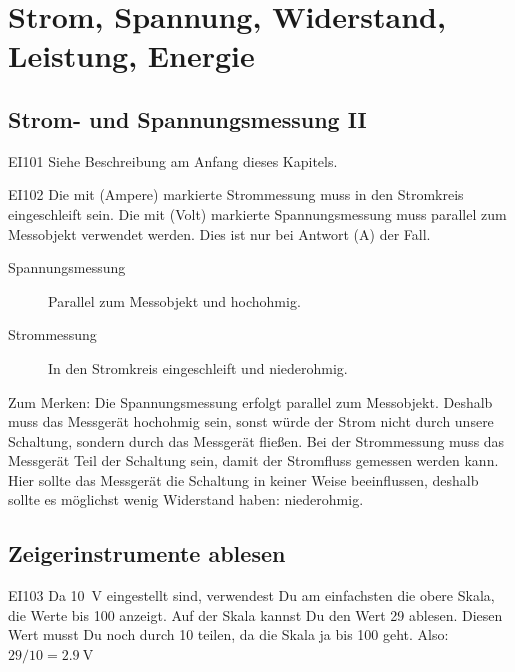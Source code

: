 \setcounter{section}{2}
\section{Strom, Spannung, Widerstand, Leistung, Energie}
\subsection{Strom- und Spannungsmessung II}

\begin{sol}{EI101}
  Siehe Beschreibung am Anfang dieses Kapitels.
\end{sol}

\begin{sol}{EI102}
  Die mit (Ampere) markierte Strommessung muss in den Stromkreis eingeschleift sein. Die mit (Volt) markierte Spannungsmessung muss parallel zum Messobjekt verwendet werden. Dies ist nur bei Antwort (A) der Fall.
\end{sol}

\begin{ohmchapter}

    \begin{description}
        \item[Spannungsmessung] Parallel zum Messobjekt und hochohmig.
        \item[Strommessung] In den Stromkreis eingeschleift und niederohmig.  
    \end{description}

    Zum Merken: Die Spannungsmessung erfolgt parallel zum Messobjekt. Deshalb muss das Messgerät hochohmig sein, sonst würde der Strom nicht durch unsere Schaltung, sondern durch das Messgerät fließen. Bei der Strommessung muss das Messgerät Teil der Schaltung sein, damit der Stromfluss gemessen werden kann. Hier sollte das Messgerät die Schaltung in keiner Weise beeinflussen, deshalb sollte es möglichst wenig Widerstand haben: niederohmig.
  \end{ohmchapter}   

\subsection{Zeigerinstrumente ablesen}



\begin{sol}{EI103}
  Da \SI{10}{\volt} eingestellt sind, verwendest Du am einfachsten die obere Skala, die Werte bis 100 anzeigt.
  Auf der Skala kannst Du den Wert 29 ablesen. Diesen Wert musst Du noch durch 10 teilen, da die Skala ja bis 100 geht.
  Also: $29 / 10 = \SI{2.9}{\volt}$
\end{sol}

